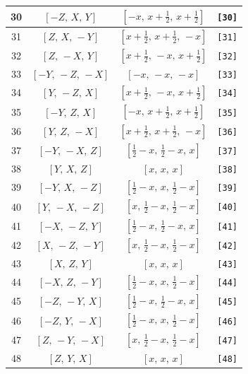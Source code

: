 \documentclass[fleqn,8pt]{jsarticle}
\begin{document}
\begin{longtable}{cccc}
30 & $\left[ - Z,\, X,\, Y \right]$ & $\left[ - x,\, x + \frac{1}{2},\, x + \frac{1}{2} \right]$ & {\tt [30]} \\ \hline
31 & $\left[ Z,\, X,\, - Y \right]$ & $\left[ x + \frac{1}{2},\, x + \frac{1}{2},\, - x \right]$ & {\tt [31]} \\ \hline
32 & $\left[ Z,\, - X,\, Y \right]$ & $\left[ x + \frac{1}{2},\, - x,\, x + \frac{1}{2} \right]$ & {\tt [32]} \\ \hline
33 & $\left[ - Y,\, - Z,\, - X \right]$ & $\left[ - x,\, - x,\, - x \right]$ & {\tt [33]} \\ \hline
34 & $\left[ Y,\, - Z,\, X \right]$ & $\left[ x + \frac{1}{2},\, - x,\, x + \frac{1}{2} \right]$ & {\tt [34]} \\ \hline
35 & $\left[ - Y,\, Z,\, X \right]$ & $\left[ - x,\, x + \frac{1}{2},\, x + \frac{1}{2} \right]$ & {\tt [35]} \\ \hline
36 & $\left[ Y,\, Z,\, - X \right]$ & $\left[ x + \frac{1}{2},\, x + \frac{1}{2},\, - x \right]$ & {\tt [36]} \\ \hline
37 & $\left[ - Y,\, - X,\, Z \right]$ & $\left[ \frac{1}{2} - x,\, \frac{1}{2} - x,\, x \right]$ & {\tt [37]} \\ \hline
38 & $\left[ Y,\, X,\, Z \right]$ & $\left[ x,\, x,\, x \right]$ & {\tt [38]} \\ \hline
39 & $\left[ - Y,\, X,\, - Z \right]$ & $\left[ \frac{1}{2} - x,\, x,\, \frac{1}{2} - x \right]$ & {\tt [39]} \\ \hline
40 & $\left[ Y,\, - X,\, - Z \right]$ & $\left[ x,\, \frac{1}{2} - x,\, \frac{1}{2} - x \right]$ & {\tt [40]} \\ \hline
41 & $\left[ - X,\, - Z,\, Y \right]$ & $\left[ \frac{1}{2} - x,\, \frac{1}{2} - x,\, x \right]$ & {\tt [41]} \\ \hline
42 & $\left[ X,\, - Z,\, - Y \right]$ & $\left[ x,\, \frac{1}{2} - x,\, \frac{1}{2} - x \right]$ & {\tt [42]} \\ \hline
43 & $\left[ X,\, Z,\, Y \right]$ & $\left[ x,\, x,\, x \right]$ & {\tt [43]} \\ \hline
44 & $\left[ - X,\, Z,\, - Y \right]$ & $\left[ \frac{1}{2} - x,\, x,\, \frac{1}{2} - x \right]$ & {\tt [44]} \\ \hline
45 & $\left[ - Z,\, - Y,\, X \right]$ & $\left[ \frac{1}{2} - x,\, \frac{1}{2} - x,\, x \right]$ & {\tt [45]} \\ \hline
46 & $\left[ - Z,\, Y,\, - X \right]$ & $\left[ \frac{1}{2} - x,\, x,\, \frac{1}{2} - x \right]$ & {\tt [46]} \\ \hline
47 & $\left[ Z,\, - Y,\, - X \right]$ & $\left[ x,\, \frac{1}{2} - x,\, \frac{1}{2} - x \right]$ & {\tt [47]} \\ \hline
48 & $\left[ Z,\, Y,\, X \right]$ & $\left[ x,\, x,\, x \right]$ & {\tt [48]} \\
\end{longtable}
\end{document}
